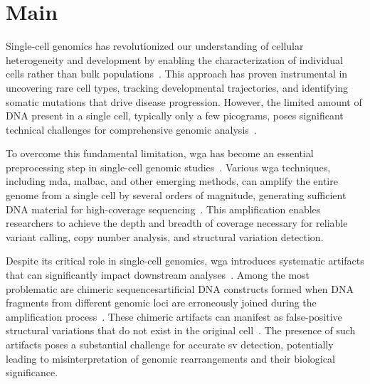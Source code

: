 \documentclass[pdflatex,sn-nature]{sn-jnl}%
\theoremstyle{thmstyleone}%
\theoremstyle{thmstyletwo}%
\theoremstyle{thmstylethree}%
\begin{document}
\maketitle

\section*{Main}\label{sec:main}

Single-cell genomics has revolutionized our understanding of cellular heterogeneity and development by enabling the characterization of individual cells rather than bulk populations~\cite{kalef2024single, sun2024mapping}.
This approach has proven instrumental in uncovering rare cell types, tracking developmental trajectories, and identifying somatic mutations that drive disease progression.
However, the limited amount of DNA present in a single cell, typically only a few picograms, poses significant technical challenges for comprehensive genomic analysis~\cite{leung2016highly, gawad2016single}.

To overcome this fundamental limitation, \gls{wga} has become an essential preprocessing step in single-cell genomic studies~\cite{zong2012genome, huang2015single}.
Various \gls{wga} techniques, including \gls{mda}, \gls{malbac}, and other emerging methods, can amplify the entire genome from a single cell by several orders of magnitude, generating sufficient DNA material for high-coverage sequencing~\cite{de2014quantitative, biezuner2021comparison,fu2015uniform, agyabeng2025evaluating}.
This amplification enables researchers to achieve the depth and breadth of coverage necessary for reliable variant calling, copy number analysis, and structural variation detection.

Despite its critical role in single-cell genomics, \gls{wga} introduces systematic artifacts that can significantly impact downstream analyses~\cite{lu2023chimera, lu2023exploration}.
Among the most problematic are chimeric sequences\textemdash artificial DNA constructs formed when DNA fragments from different genomic loci are erroneously joined during the amplification process~\cite{lu2023chimera, lu2023exploration, agyabeng2025evaluating}.
These chimeric artifacts can manifest as false-positive structural variations that do not exist in the original cell~\cite{lu2023chimera}.
The presence of such artifacts poses a substantial challenge for accurate \gls{sv} detection, potentially leading to misinterpretation of genomic rearrangements and their biological significance.
\end{document}
